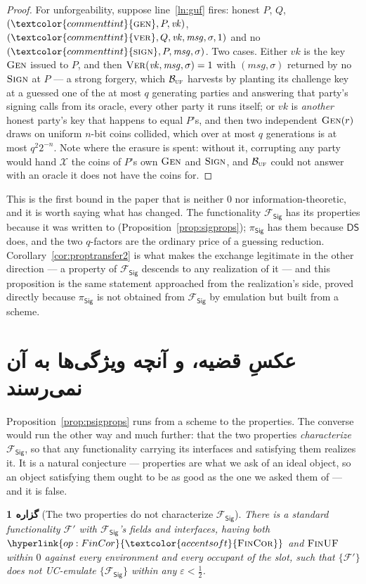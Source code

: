 \documentclass[10pt,oneside,openany]{book}
\newcommand{\F}{\mathcal{F}}
\newcommand{\op}[1]{\textnormal{\textsc{#1}}}
\newcommand{\opl}[1]{\hyperlink{op:#1}{\textcolor{accentsoft}{\op{#1}}}}
\newcommand{\atom}[1]{\textcolor{commenttint}{\op{#1}}}
\newcommand{\Fsig}{\mathcal{F}_{\mathsf{Sig}}}
\newcommand{\DS}{\mathsf{DS}}
\newcommand{\psig}{\pi_{\mathsf{Sig}}}
\newcommand{\vk}{\mathit{vk}}
\newcommand{\msg}{\mathit{msg}}
\theoremstyle{accentdef}
\theoremstyle{accentplain}
\newtheorem{proposition}[definition]{گزاره}
\begin{document}
\begin{proof}
For unforgeability, suppose line~\ref{ln:guf} fires: honest $P$, $Q$, $(\atom{gen},P,\vk)$,
$(\atom{ver},Q,\vk,\msg,\sigma,1)$ and no $(\atom{sign},P,\msg,\sigma)$. Two cases. Either $\vk$ is
the key $\op{Gen}$ issued to $P$, and then $\op{Ver}(\vk,\msg,\sigma) = 1$ with $(\msg,\sigma)$
returned by no $\op{Sign}$ at $P$ --- a strong forgery, which $\mathcal{B}_{\op{uf}}$ harvests by
planting its challenge key at a guessed one of the at most $q$ generating parties and answering
that party's signing calls from its oracle, every other party it runs itself; or $\vk$ is
\emph{another} honest party's key that happens to equal $P$'s, and then two independent
$\op{Gen}(r)$ draws on uniform $n$-bit coins collided, which over at most $q$ generations is at
most $q^{2}2^{-n}$. Note where the erasure is spent: without it, corrupting any party would hand
$\mathcal{X}$ the coins of $P$'s own $\op{Gen}$ and $\op{Sign}$, and $\mathcal{B}_{\op{uf}}$ could
not answer with an oracle it does not have the coins for.
\end{proof}

This is the first bound in the paper that is neither $0$ nor information-theoretic, and it is
worth saying what has changed. The functionality $\Fsig$ has its properties because it was written to
(Proposition~\ref{prop:sigprops}); $\psig$ has them because $\DS$ does, and the two $q$-factors
are the ordinary price of a guessing reduction. Corollary~\ref{cor:proptransfer2} is what makes
the exchange legitimate in the other direction --- a property of $\Fsig$ descends to any
realization of it --- and this proposition is the same statement approached from the realization's
side, proved directly because $\psig$ is not obtained from $\Fsig$ by emulation but built from a
scheme.

\section{عکسِ قضیه، و آنچه ویژگی‌ها به آن نمی‌رسند}\label{sec:sigconv}

Proposition~\ref{prop:psigprops} runs from a scheme to the properties. The converse would run the
other way and much further: that the two properties \emph{characterize} $\Fsig$, so that any
functionality carrying its interfaces and satisfying them realizes it. It is a natural conjecture
--- properties are what we ask of an ideal object, so an object satisfying them ought to be as good
as the one we asked them of --- and it is false.

\begin{proposition}[The two properties do not characterize $\Fsig$]\label{prop:convfails}
There is a standard functionality $\F'$ with $\Fsig$'s fields and interfaces, having both
$\opl{FinCor}$ and $\op{FinUF}$ within $0$ against every environment and every occupant of the
slot, such that $\{\F'\}$ does not UC-emulate $\{\Fsig\}$ within any $\varepsilon < \tfrac12$.
\end{proposition}
\end{document}
